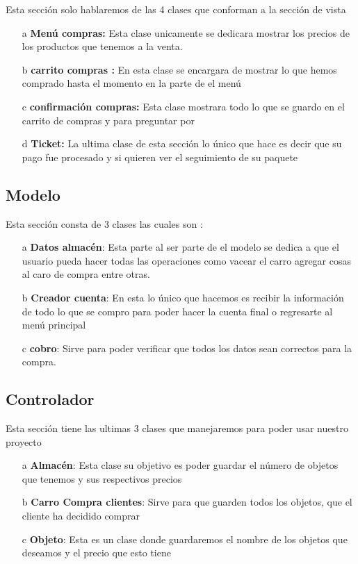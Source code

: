 \documentclass[10pt,a4paper]{article}
\begin{document}
\begin{flushleft}
\begin{flushleft}
Esta sección solo hablaremos de las 4 clases que conforman a la sección de vista 
\end{flushleft}

\begin{itemize}
\item[a] \textbf{Menú compras:} Esta clase unicamente se dedicara mostrar los precios de los productos que tenemos a la venta.  
\item[b] \textbf{carrito compras :} En esta clase se encargara de mostrar lo que hemos comprado hasta el momento en la parte de el menú 
\item[c] \textbf{confirmación compras:} Esta clase mostrara todo lo que se guardo en el carrito de compras y para preguntar por 
\item[d] \textbf{Ticket:} La ultima clase de esta sección lo único que hace es decir que su pago fue procesado y si quieren ver el seguimiento de su paquete 
\end{itemize}

\subsection{Modelo}

Esta sección consta de 3 clases las cuales son :
\begin{itemize}
\item[a] \textbf{Datos almacén}: Esta parte al ser parte de el modelo se dedica a que el usuario pueda hacer todas las operaciones como vacear el carro agregar cosas al caro de compra entre otras.
\item[b] \textbf{Creador cuenta}: En esta lo único que hacemos es recibir la información de todo lo que  se compro para poder hacer la cuenta final o regresarte al menú principal

\item[c] \textbf{cobro}: Sirve para poder verificar que todos los datos sean correctos para la compra. 
\end{itemize}

\subsection{Controlador}

Esta sección tiene las ultimas 3 clases que manejaremos para poder usar nuestro proyecto
\begin{itemize}
\item[a]\textbf{Almacén}: Esta clase su objetivo es poder guardar el número de objetos que tenemos y sus respectivos precios 	
\item[b]\textbf{Carro Compra clientes}: Sirve para que guarden todos los objetos, que el cliente ha decidido comprar  
\item[c]\textbf{Objeto}: Esta es un clase donde guardaremos el nombre de los objetos que deseamos y el precio que esto tiene 
\end{itemize}
\end{flushleft}
\end{document}
